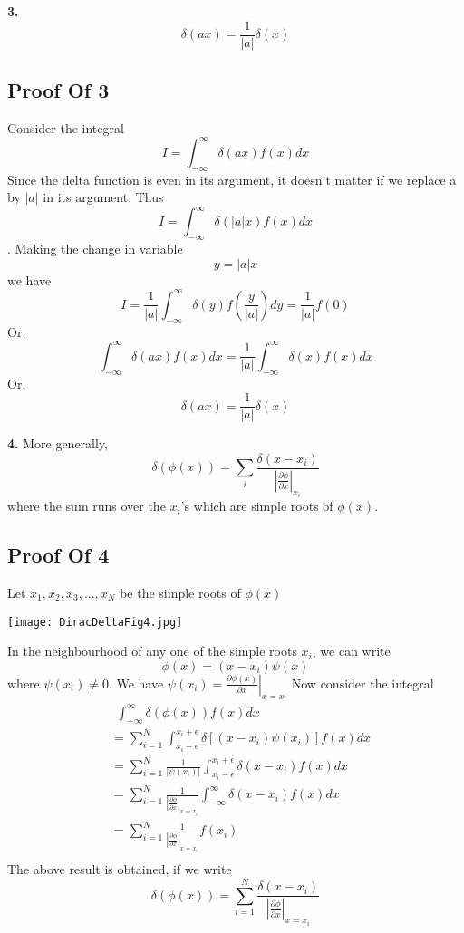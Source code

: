 \textbf{3.} $$\delta (ax) = \frac{1}{|a|} \delta(x) $$

\subsection*{Proof Of 3}
Consider the integral $$I = \int_{-\infty}^{\infty}\delta(ax) f(x) dx $$
Since the delta function is even in its argument, it doesn't matter if we replace a by $|a|$ in its argument. Thus $$I = \int_{-\infty}^{\infty}\delta(|a|x) f(x) dx $$.
Making the change in variable $$y=|a|x$$ we have $$I = \frac{1}{|a|} \int_{-\infty}^{\infty}\delta(y) f \left( \frac{y}{|a|} \right) dy = \frac{1}{|a|} f(0)$$
Or, $$ \int_{-\infty}^{\infty}\delta(ax) f ( x ) dx = \frac{1}{|a|} \int_{-\infty}^{\infty}\delta(x) f(x)dx$$ 
Or, $$\delta (ax) = \frac{1}{|a|}\delta(x) $$

\textbf{4.} More generally, $$\delta (\phi(x)) = \sum_i \frac{\delta(x-x_i)}{\left| \frac{\partial \phi}{\partial x} \right|_{x_i}}$$
where the sum runs over the $x_i$'s which are simple roots of $\phi(x)$.

\subsection*{Proof Of 4}
Let $x_1, x_2, x_3,..., x_N$ be the simple roots of $\phi(x)$

\vspace{0.2cm}
\begin{center}
\texttt{[image: DiracDeltaFig4.jpg]}
\end{center}
In the neighbourhood of any one of the simple roots $x_i$, we can write $$\phi (x) = (x-x_i) \psi(x)$$ where $\psi(x_i) \neq 0$. We have $\psi (x_i) = \left. \frac{\partial \phi(x)}{\partial x} \right|_{x=x_i}$
Now consider the integral
\begin{align*}
&\ \  \int_{-\infty}^{\infty} \delta(\phi(x)) f(x) dx \\
&=\sum_{i=1}^N \int_{x_i - \epsilon}^{x_i + \epsilon} \delta[(x-x_i) \psi(x_i)] f(x) dx \\
&=\sum_{i=1}^N \frac{1}{|\psi(x_i)|} \int_{x_i - \epsilon}^{x_i + \epsilon} \delta(x-x_i) f(x) dx \\
&=\sum_{i=1}^N \frac{1}{|\frac{\partial \phi}{\partial x}|_{x=x_i}} \int_{-\infty}^{\infty} \delta(x-x_i) f(x) dx \\
&=\sum_{i=1}^N \frac{1}{|\frac{\partial \phi}{\partial x}|_{x=x_i}} f(x_i) \\
\end{align*}
The above result is obtained, if we write $$\delta (\phi (x)) = \sum_{i=1}^N \frac{\delta(x-x_i)}{\left| \frac{\partial \phi}{\partial x} \right|_{x=x_i}} $$

